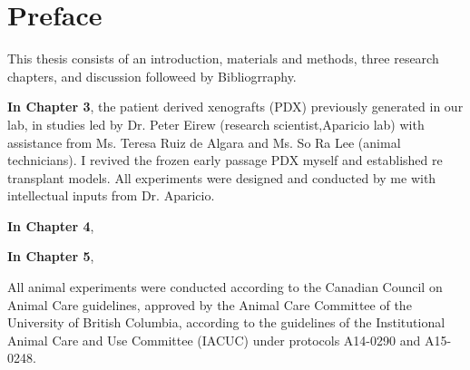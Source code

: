 
\chapter{Preface}

This thesis consists of an introduction, materials and methods, three research chapters, and discussion followeed by Bibliogrraphy.

\textbf{In Chapter 3}, the patient derived xenografts (PDX) previously generated in our lab, in studies led by Dr. Peter Eirew (research scientist,Aparicio lab) with assistance from Ms. Teresa Ruiz de Algara and Ms. So Ra Lee (animal technicians). I revived the frozen early passage PDX myself and established re transplant models. All experiments were designed and conducted by me with intellectual inputs from Dr. Aparicio.

\textbf{In Chapter 4},

\textbf{In Chapter 5},


All animal experiments were conducted according to the Canadian Council on Animal Care guidelines, approved by the Animal Care Committee of the University of British Columbia, according to the guidelines of the Institutional Animal Care and Use Committee (IACUC) under protocols A14-0290 and A15-0248.